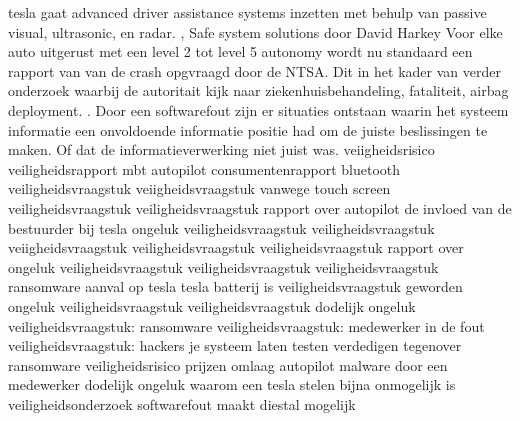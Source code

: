 tesla gaat advanced driver assistance systems inzetten met behulp van  passive visual, ultrasonic, en radar.
\cite{tasking07062017TeslaAugmentedSafety},\cite{ackerman01072016TeslaImperfect}
Safe system solutions door David Harkey
\cite{Harkey30052019SafeSystemVehicle}
Voor elke auto uitgerust met een level 2 tot level 5 autonomy wordt nu standaard een rapport van van de crash opgvraagd door de NTSA. Dit in het kader van verder onderzoek waarbij de autoritait kijk naar  ziekenhuisbehandeling, fataliteit, airbag deployment.
\cite{szymkowski29062021nhtsaTeslaCrashReports}. 
Door een softwarefout zijn er situaties ontstaan waarin het systeem informatie een onvoldoende informatie positie had om de juiste beslissingen te maken. Of dat de informatieverwerking niet juist was.
\cite{teslaFDSCrash}
\cite{teslaCrashesCauses}
\cite{teslacrashOvervieuw}
\cite{tesladeaths}
veiigheidsrisico
\cite{evan01042019teslaautopilotIntersection}
\cite{testVehicleSafetyReport}
veiligheidsrapport mbt autopilot
\cite{lambert31062020q2safetyreport}
consumentenrapport
bluetooth veiligheidsvraagstuk
\cite{wiredBloutoothHackTesla}
veiigheidsvraagstuk vanwege touch screen
\cite{preston14012021NHTSATeslaRecall}
veiligheidsvraagstuk
\cite{cio25112020belgianTeslaHack}
veiligheidsvraagstuk
rapport over autopilot
\cite{templeton06092019HTSBReportTesla}
de invloed van de bestuurder bij tesla ongeluk
veiligheidsvraagstuk
\cite{darkReading17112020TeslaBackup}
veiligheidsvraagstuk
\cite{leyden23032020TeslaInterfaceHack}
veiigheidsvraagstuk
\cite{huddlestonjr03042019ChineseTeslaHack}
veiligheidsvraagstuk
veiligheidsvraagstuk
\cite{heilweil26022020teslaAutopilot}
rapport over ongeluk
veiligheidsvraagstuk
veiligheidsvraagstuk
\cite{blanco04102019NHTSATesla}
veiligheidsvraagstuk
ransomware aanval op tesla
tesla batterij is veiligheidsvraagstuk geworden
\cite{mitchell01072020teslabatterycooling}
ongeluk
\cite{bbc26022020AutopilotCrash}
veiligheidsvraagstuk
veiligheidsvraagstuk
\cite{stumpff04052020TeslaPersonalData}
dodelijk ongeluk
\cite{levin08062018teslaautopilotsafety}
veiligheidsvraagstuk: ransomware
veiligheidsvraagstuk: medewerker in de fout
\cite{cbrook06082021TeslaInsideDataThreft}
\cite{shilling25022021Tesla}
veiligheidsvraagstuk: hackers je systeem laten testen
verdedigen tegenover ransomware
veiligheidsrisico
prijzen omlaag
autopilot
\cite{randall05112019modelSurvey}
malware door een medewerker
dodelijk ongeluk
\cite{fottrell03092018TeslaSecurityChecks}
waarom een tesla stelen bijna onmogelijk is
veiligheidsonderzoek
softwarefout maakt diestal mogelijk
\cite{kirk26112020modelX}
